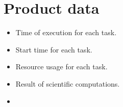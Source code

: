 {


\setcounter{funcD}{10}
\renewcommand{\labelitemi}{
	\ifnum \value{funcD}<10$/D 0\arabic{funcD} /$\addtocounter{funcD}{10}
	\else $/D \arabic{funcD} /$\addtocounter{funcD}{10}\fi
	}
\section{Product data}
	\begin{itemize}
		\item Time of execution for each task.
		\item Start time for each task.
		\item Resource usage for each task.
		\item Result of scientific computations.
		\item 	
	\end{itemize}

}